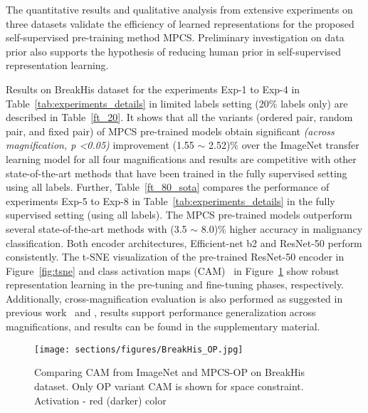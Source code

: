 \documentclass[conference]{IEEEtran}
\begin{document}
The quantitative results and qualitative analysis from extensive experiments on three datasets validate the efficiency of learned representations for the proposed self-supervised pre-training method MPCS. Preliminary investigation on data prior also supports the hypothesis of reducing human prior in self-supervised representation learning.

Results on BreakHis dataset for the experiments Exp-1 to Exp-4 in Table~\ref{tab:experiments_details}  in limited labels setting (20\% labels only) are described in Table~\ref{ft_20}. It shows that all the variants (ordered pair, random pair, and fixed pair) of MPCS pre-trained models obtain significant \textit{(across magnification, p \textless 0.05)} improvement (1.55 $\sim$ 2.52)\% over the ImageNet transfer learning model for all four magnifications and results are competitive with other state-of-the-art methods that have been trained in the fully supervised setting using all labels. Further, Table~\ref{ft_80_sota} compares the performance of experiments Exp-5 to Exp-8 in Table~\ref{tab:experiments_details} in the fully supervised setting (using all labels). The MPCS pre-trained models outperform several state-of-the-art methods with (3.5 $\sim$ 8.0)\% higher accuracy in malignancy classification. Both encoder architectures, Efficient-net b2 and ResNet-50 perform consistently. The t-SNE visualization of the pre-trained ResNet-50 encoder in Figure~\ref{fig:tsne} and class activation maps (CAM)~\cite{selvaraju2017grad} in Figure~\ref{fig:cam_breakhis} show robust representation learning in the pre-tuning and fine-tuning phases, respectively. Additionally, cross-magnification evaluation is also performed as suggested in previous work~\cite{gupta2017breast} and \cite{sikaroudi2021magnification}, results support performance generalization across magnifications, and results can be found in the supplementary material.
\begin{figure}[!ht]
    \centering
    \texttt{[image: sections/figures/BreakHis\_OP.jpg]}
    \caption{Comparing CAM from ImageNet and MPCS-OP on BreakHis dataset. Only OP variant CAM is shown for space constraint. Activation - red (darker) color}
    \label{fig:cam_breakhis}
    \vspace{-6mm}
\end{figure}
\end{document}

